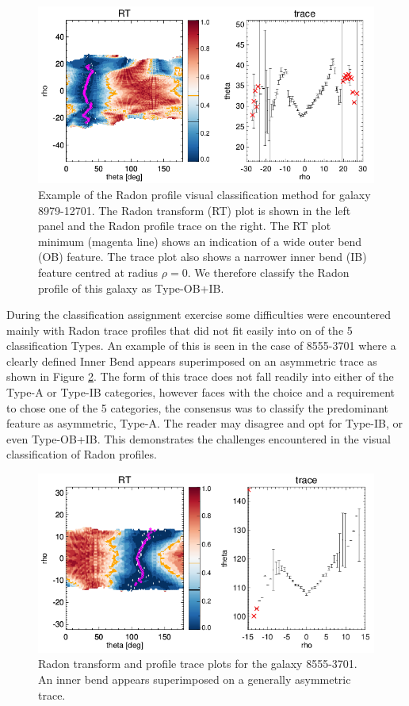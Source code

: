 \begin{figure}
    \centering
    \includegraphics[width=\columnwidth]{images/RadonPlots/RT-SNIPS-NEW/8979-12701-VA-OB+IB.png}
    \caption{Example of the Radon profile visual classification method for galaxy 8979-12701. The Radon transform (RT) plot is shown in the left panel and the Radon profile trace on the right. The RT plot minimum (magenta line) shows an indication of a wide outer bend (OB) feature. The trace plot also shows a narrower inner bend (IB) feature centred at radius $\rho=0$. We therefore classify the Radon profile of this galaxy as Type-OB+IB.}
    \label{fig:OB+IB}
\end{figure}

During the classification assignment exercise  some difficulties were encountered mainly with Radon trace profiles that did not fit easily into on of the 5 classification Types. An example of this is seen in the case of 8555-3701 where a clearly defined Inner Bend appears superimposed on an asymmetric trace as shown in Figure \ref{fig:8555-3701-A+IB}. The form of this trace does not fall readily into either of the Type-A or Type-IB categories, however faces with the choice and a requirement to chose one of the 5 categories, the consensus was to classify the predominant feature as asymmetric, Type-A. The reader may disagree and opt for Type-IB, or even Type-OB+IB. This demonstrates the challenges encountered in the visual classification of Radon profiles.

\begin{figure}
    \centering
    \includegraphics[width=\columnwidth]{images/RadonPlots/RT-SNIPS-NEW/8555-3701-A+IB.png}
    \caption{Radon transform and profile trace plots for the galaxy 8555-3701. An inner bend appears superimposed on a generally asymmetric trace.}
    \label{fig:8555-3701-A+IB}
\end{figure}

